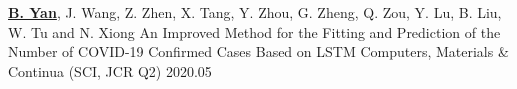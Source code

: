 \begin{cventries}

\cventry
{\underline{\textbf{B. Yan}}, J. Wang, Z. Zhen, X. Tang, Y. Zhou, G. Zheng, Q. Zou, Y. Lu, B. Liu, W. Tu and N. Xiong} %
{An Improved Method for the Fitting and Prediction of the Number of COVID-19 Confirmed Cases Based on LSTM} %
{Computers, Materials \& Continua (SCI, JCR Q2)} %
{2020.05} %
{
}

\end{cventries}
